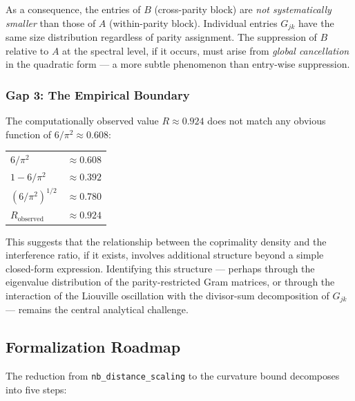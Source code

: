 \documentclass[11pt,a4paper]{article}
\theoremstyle{definition}
\theoremstyle{remark}
\newcommand{\lean}[1]{\texttt{#1}}
\begin{document}
As a consequence, the entries of $B$ (cross-parity block) are
\emph{not systematically smaller} than those of $A$ (within-parity
block). Individual entries $G_{jk}$ have the same size distribution
regardless of parity assignment. The suppression of $B$ relative
to $A$ at the spectral level, if it occurs, must arise from
\emph{global cancellation} in the quadratic form --- a more
subtle phenomenon than entry-wise suppression.

\subsubsection*{Gap 3: The Empirical Boundary}

The computationally observed value $R \approx 0.924$ does not match
any obvious function of $6/\pi^2 \approx 0.608$:
\begin{center}
\begin{tabular}{ll}
$6/\pi^2$ & $\approx 0.608$ \\
$1 - 6/\pi^2$ & $\approx 0.392$ \\
$(6/\pi^2)^{1/2}$ & $\approx 0.780$ \\
$R_{\mathrm{observed}}$ & $\approx 0.924$
\end{tabular}
\end{center}
This suggests that the relationship between the coprimality density
and the interference ratio, if it exists, involves additional
structure beyond a simple closed-form expression. Identifying this
structure --- perhaps through the eigenvalue distribution of the
parity-restricted Gram matrices, or through the interaction of
the Liouville oscillation with the divisor-sum decomposition of
$G_{jk}$ --- remains the central analytical challenge.

\subsection{Formalization Roadmap}

The reduction from \lean{nb\_distance\_scaling} to the curvature
bound decomposes into five steps:
\end{document}
